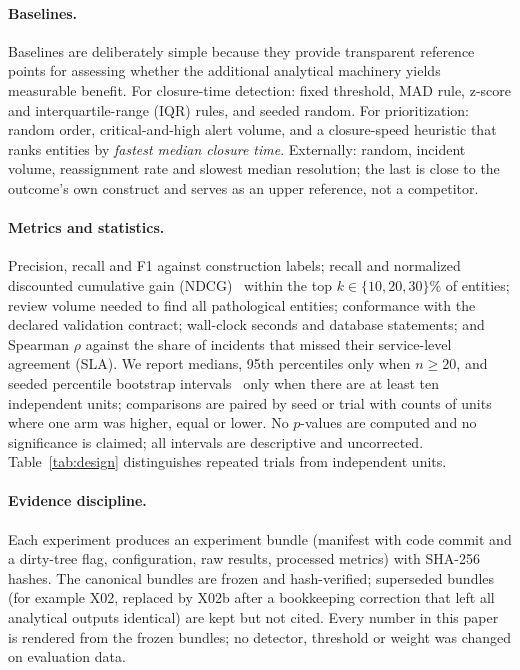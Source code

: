 \paragraph{Baselines.} Baselines are deliberately simple because they provide
transparent reference points for assessing whether the additional analytical
machinery yields measurable benefit. For closure-time detection:
fixed threshold, MAD rule, z-score and interquartile-range (IQR) rules, and seeded
random. For prioritization: random order, critical-and-high alert volume, and a
closure-speed heuristic that ranks entities by \emph{fastest median closure time}.
Externally: random, incident volume, reassignment rate and slowest median
resolution; the last is close to the outcome's own construct and serves as an upper
reference, not a competitor.

\paragraph{Metrics and statistics.} Precision, recall and F1 against construction
labels; recall and normalized discounted cumulative gain
(NDCG)~\cite{jarvelin2002ndcg} within the top $k\in\{10,20,30\}\%$ of entities;
review volume needed to find all pathological entities; conformance with the declared
validation contract; wall-clock seconds and database statements; and Spearman $\rho$
against the share of incidents that missed their service-level agreement (SLA). We
report medians, 95th percentiles only when $n\ge 20$, and seeded percentile bootstrap
intervals~\cite{efron1993bootstrap} only when there are at least ten independent
units; comparisons are paired by seed or trial with counts of units where one arm was
higher, equal or lower. No $p$-values are computed and no significance is claimed; all
intervals are descriptive and uncorrected. Table~\ref{tab:design} distinguishes
repeated trials from independent units.

\paragraph{Evidence discipline.} Each experiment produces an experiment bundle
(manifest with code commit and a dirty-tree flag, configuration, raw results,
processed metrics) with SHA-256 hashes. The canonical bundles are frozen and
hash-verified; superseded bundles (for example X02, replaced by X02b after a
bookkeeping correction that left all analytical outputs identical) are kept but not
cited. Every number in this paper is rendered from the frozen bundles; no detector,
threshold or weight was changed on evaluation data.

